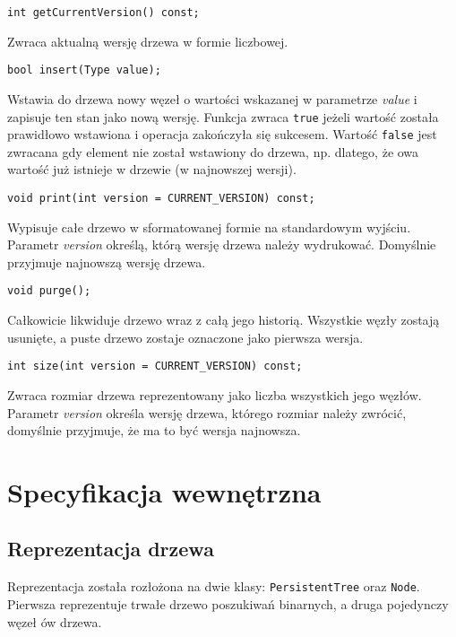 \documentclass[a4paper,twoside]{article}
\begin{document}
	\begin{lstlisting}[caption=getCurrentVersion]
int getCurrentVersion() const;
	\end{lstlisting}
	Zwraca aktualną wersję drzewa w formie liczbowej.
	\begin{lstlisting}[caption=insert]
bool insert(Type value);
	\end{lstlisting}
	Wstawia do drzewa nowy węzeł o wartości wskazanej w parametrze \textit{value} i zapisuje ten stan jako nową wersję. Funkcja zwraca \lstinline|true| jeżeli wartość została prawidłowo wstawiona i operacja zakończyła się sukcesem. Wartość \lstinline|false| jest zwracana gdy element nie został wstawiony do drzewa, np. dlatego, że owa wartość już istnieje w drzewie (w najnowszej wersji).
	\begin{lstlisting}[caption=print]
void print(int version = CURRENT_VERSION) const;
	\end{lstlisting}
	Wypisuje całe drzewo w sformatowanej formie na standardowym wyjściu. Parametr \textit{version} określą, którą wersję drzewa należy wydrukować. Domyślnie przyjmuje najnowszą wersję drzewa.
	\begin{lstlisting}[caption=purge]
void purge();
	\end{lstlisting}
	Całkowicie likwiduje drzewo wraz z całą jego historią. Wszystkie węzły zostają usunięte, a puste drzewo zostaje oznaczone jako pierwsza wersja.
	\begin{lstlisting}[caption=size]
int size(int version = CURRENT_VERSION) const;
	\end{lstlisting}
	Zwraca rozmiar drzewa reprezentowany jako liczba wszystkich jego węzłów. Parametr \textit{version} określa wersję drzewa, którego rozmiar należy zwrócić, domyślnie przyjmuje, że ma to być wersja najnowsza.
	
	\section{Specyfikacja wewnętrzna}
	\subsection{Reprezentacja drzewa}
	Reprezentacja została rozłożona na dwie klasy: \lstinline|PersistentTree| oraz \lstinline|Node|. Pierwsza reprezentuje trwałe drzewo poszukiwań binarnych, a druga pojedynczy węzeł ów drzewa.
\end{document}
